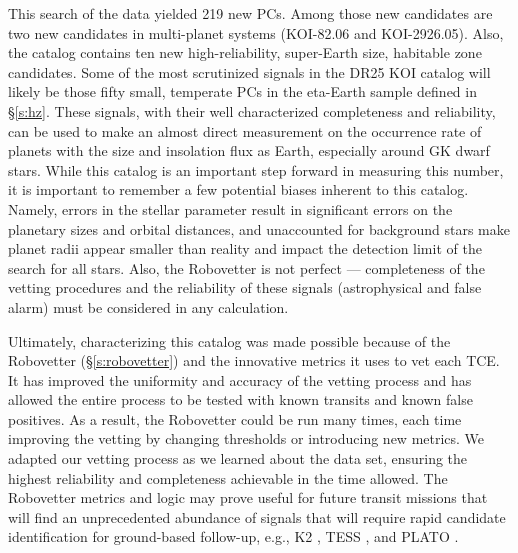 This search of the \Kepler{} data yielded 219 new PCs. Among those new candidates are two new candidates in multi-planet systems (KOI-82.06 and KOI-2926.05).  Also, the catalog contains ten new high-reliability, super-Earth size, habitable zone candidates.  Some of the most scrutinized signals in the DR25 KOI catalog will likely be those fifty small, temperate PCs in the eta-Earth sample defined in \S\ref{s:hz}.  These signals, with their well characterized completeness and reliability, can be used to make an almost direct measurement on the occurrence rate of planets with the size and insolation flux as Earth, especially around GK dwarf stars.  While this catalog is an important step forward in measuring this number, it is important to remember a few potential biases inherent to this catalog. Namely, errors in the stellar parameter result in significant errors on the planetary sizes and orbital distances, and unaccounted for background stars make planet radii appear smaller than reality and impact the detection limit of the search for all stars.  Also, the Robovetter is not perfect --- completeness of the vetting procedures and the reliability of these signals (astrophysical and false alarm) must be considered in any calculation.


Ultimately, characterizing this catalog was made possible because of the Robovetter (\S\ref{s:robovetter}) and the innovative metrics it uses to vet each TCE. It has improved the uniformity and accuracy of the vetting process and has allowed the entire process to be tested with known transits and known false positives. As a result, the Robovetter could be run many times, each time improving the vetting by changing thresholds or introducing new metrics. We adapted our vetting process as we learned about the data set, ensuring the highest reliability and completeness achievable in the time allowed.  The Robovetter metrics and logic may prove useful for future transit missions that will find an unprecedented abundance of signals that will require rapid candidate identification for ground-based follow-up, e.g., K2 \citep{Howell2014}, TESS \citep{Ricker2015}, and PLATO \citep{Rauer2016}.  


